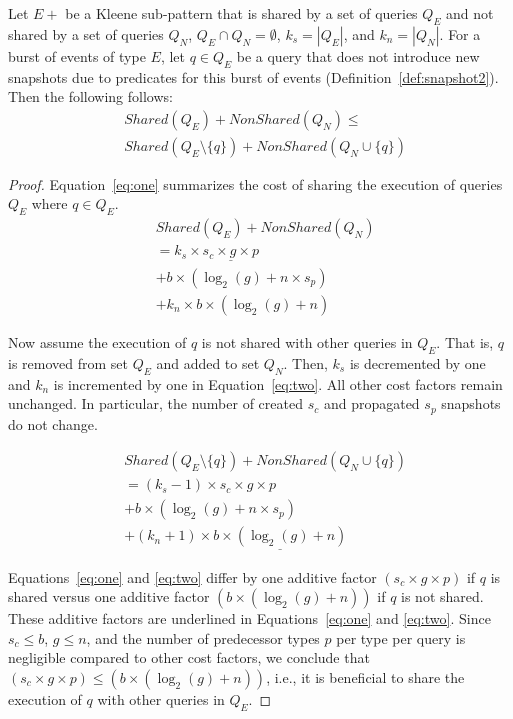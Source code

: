 \begin{theorem}
%
Let $E+$ be a Kleene sub-pattern that is shared by a set of queries $Q_E$ and not shared by a set of queries $Q_N$,
$Q_E \cap Q_N = \emptyset$,
$k_s = |Q_E|$, and
$k_n = |Q_N|$.
For a burst of events of type $E$,
let $q \in Q_E$ be a query that does not introduce new snapshots due to predicates for this burst of events (Definition~\ref{def:snapshot2}). 
Then the following follows:
%
\begin{align}
& \mathit{Shared}(Q_E) + \mathit{NonShared}(Q_N) \leq \nonumber\\
& \mathit{Shared}(Q_E \setminus \{q\}) + \mathit{NonShared}(Q_N \cup \{q\}) \nonumber
\end{align}
%
\label{theo:pruning-1}
\end{theorem}
\vspace{-5mm}

\begin{proof}
%
Equation~\ref{eq:one} summarizes the cost of sharing the execution of queries $Q_E$ where $q \in Q_E$. 
%
\begin{align}
&\mathit{Shared}(Q_E) + \mathit{NonShared}(Q_N) \nonumber\\
&= k_s \times \underline{s_c \times g \times p} \nonumber\\
&+ b \times (\log_2(g) + n \times s_p) \nonumber\\
&+ k_n \times b \times (\log_2(g) + n)
\label{eq:one}
\end{align}

Now assume the execution of $q$ is not shared with other queries in $Q_E$. That is, $q$ is removed from set $Q_E$ and added to set $Q_N$. Then, $k_s$ is decremented by one and $k_n$ is incremented by one in Equation~\ref{eq:two}. All other cost factors remain unchanged. In particular, the number of created $s_c$ and propagated $s_p$ snapshots do not change.

\begin{align}
&\mathit{Shared}(Q_E \setminus \{q\}) + \mathit{NonShared}(Q_N \cup \{q\}) \nonumber\\
&= (k_s-1) \times s_c \times g \times p \nonumber\\
&+ b \times (\log_2(g) + n \times s_p) \nonumber\\
&+ (k_n+1) \times \underline{b \times (\log_2(g) + n)} 
\label{eq:two}
\end{align}

Equations~\ref{eq:one} and \ref{eq:two} differ by one additive factor $(s_c \times g \times p)$ if $q$ is shared versus one additive factor $(b \times (\log_2(g) + n))$ if $q$ is not shared. These additive factors are underlined in Equations~\ref{eq:one} and \ref{eq:two}. Since $s_c \leq b$, $g \leq n$, and the number of predecessor types $p$ per type per query is negligible compared to other cost factors, we conclude that $(s_c \times g \times p) \leq (b \times (\log_2(g) + n))$, i.e., it is beneficial to share the execution of $q$ with other queries in $Q_E$.
%
\end{proof}

